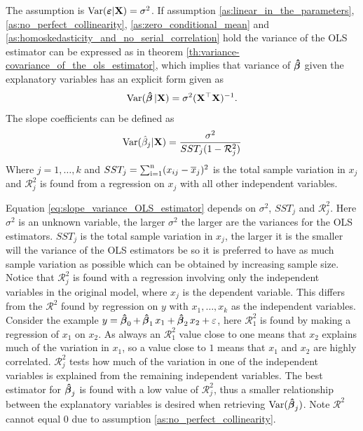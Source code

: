 The \homo assumption is $\operatorname{\text{Var}}(\boldsymbol{\varepsilon} | \mathbf{X}) = \sigma^2$. If assumption \ref{as:linear_in_the_parameters}, \ref{as:no_perfect_collinearity}, \ref{as:zero_conditional_mean} and \ref{as:homoskedasticity_and_no_serial_correlation} hold the variance of the OLS estimator can be expressed as in theorem \ref{th:variance-covariance_of_the_ols_estimator}, which implies that variance of $\operatorname{\boldsymbol{\hat{\beta}}}$ given the explanatory variables has an explicit form given as
\begin{align*}
    \operatorname{\text{Var}}(\operatorname{\boldsymbol{\hat{\beta}}} | \mathbf{X}) = \sigma^2(\mathbf{X}^\top\mathbf{X})^{-1}.
\end{align*}
The slope coefficients can be defined as 
\begin{align}\label{eq:slope_variance_OLS_estimator}
    \operatorname{\text{Var}}(\hat{\beta}_j|\mathbf{X}) = \dfrac{\sigma^2}{SST_j(1- \mathcal{R}_j^2)}
\end{align}
Where $j = 1, \ldots, k$ and $SST_j = \operatorname{\sum_{i=1}^n} (x_{ij} - \overline{x}_j)^2$ is the total sample variation in $x_j$ and $\mathcal{R}^2_j$ is found from a regression on $x_j$ with all other independent variables. 

Equation \eqref{eq:slope_variance_OLS_estimator} depends on $\sigma^2$, $SST_j$ and $\mathcal{R}^2_j$.
Here $\sigma^2$ is an unknown variable, the larger $\sigma^2$ the larger are the variances for the OLS estimators. $SST_j$ is the total sample variation in $x_j$, the larger it is the smaller will the variance of the OLS estimators be so it is preferred to have as much sample variation as possible which can be obtained by increasing sample size. 
Notice that $\mathcal{R}^2_j$ is found with a regression involving only the independent variables in the original model, where $x_j$ is the dependent variable. This differs from the $\mathcal{R}^2$ found by regression on $y$ with $x_1, \ldots, x_k$ as the independent variables. 
Consider the example $y = \operatorname{\boldsymbol{\hat{\beta}}}_0 + \operatorname{\boldsymbol{\hat{\beta}}}_1 x_1 + \operatorname{\boldsymbol{\hat{\beta}}}_2 x_2 + \varepsilon$, here $\mathcal{R}^2_1$ is found by making a regression of $x_1$ on $x_2$. 
As always an $\mathcal{R}^2_1$ value close to one means that $x_2$ explains much of the variation in $x_1$, so a value close to $1$ means that $x_1$ and $x_2$ are highly correlated.
$\mathcal{R}^2_j$ tests how much of the variation in one of the independent variables is explained from the remaining independent variables.
The best estimator for $\operatorname{\boldsymbol{\hat{\beta}}}_j$ is found with a low value of $\mathcal{R}^2_j$, thus a smaller relationship between the explanatory variables is desired when retrieving $\operatorname{\text{Var}}(\operatorname{\boldsymbol{\hat{\beta}}}_j)$. Note $\mathcal{R}^2$ cannot equal $0$ due to assumption \ref{as:no_perfect_collinearity}. 

